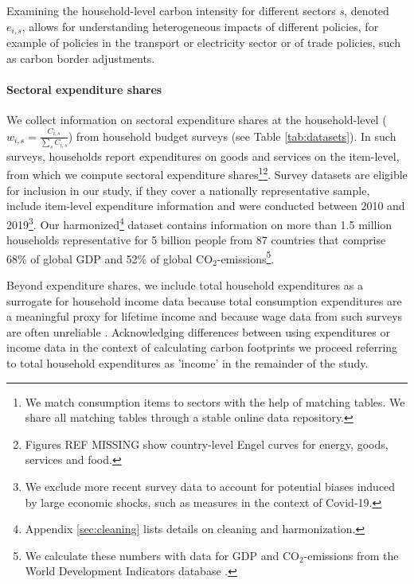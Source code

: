 \documentclass[12pt, a4paper]{article}
\begin{document}

Examining the household-level carbon intensity for different sectors \textit{s}, denoted $e_{i,s}$, allows for understanding heterogeneous impacts of different policies, for example of policies in the transport or electricity sector or of trade policies, such as carbon border adjustments.

\paragraph{Sectoral expenditure shares} We collect information on sectoral expenditure shares at the household-level ($w_{i,s}=\frac{C_{i,s}}{\sum_{s}C_{i,s}}$) from household budget surveys (see Table \ref{tab:datasets}). In such surveys, households report expenditures on goods and services on the item-level, from which we compute sectoral expenditure shares\footnote{We match consumption items to sectors with the help of matching tables. We share all matching tables through a stable online data repository.}\footnote{Figures REF MISSING show country-level Engel curves for energy, goods, services and food.}.
Survey datasets are eligible for inclusion in our study, if they cover a nationally representative sample, include item-level expenditure information and were conducted between 2010 and 2019\footnote{We exclude more recent survey data to account for potential biases induced by large economic shocks, such as measures in the context of Covid-19.}. Our harmonized\footnote{Appendix \ref{sec:cleaning} lists details on cleaning and harmonization.} dataset contains information on more than 1.5 million households representative for 5 billion people from 87 countries that comprise 68\% of global GDP and 52\% of global CO$_{2}$-emissions\footnote{We calculate these numbers with data for GDP and CO$_{2}$-emissions from the World Development Indicators database \autocite{WorldBankGroup.2023}.}.

Beyond expenditure shares, we include total household expenditures as a surrogate for household income data because total consumption expenditures are a meaningful proxy for lifetime income \autocite{Poterba.1989,JamesM.Poterba.2016,Cronin.2019} and because wage data from such surveys are often unreliable \autocite{Blundell.1998}. Acknowledging differences between using expenditures or income data in the context of calculating carbon footprints \textcite{Levay.2023} we proceed referring to total household expenditures as 'income' in the remainder of the study.
\end{document}
